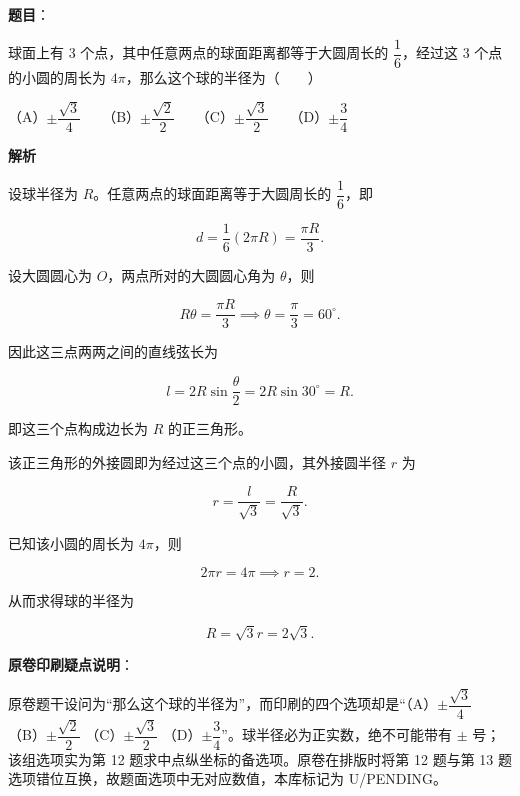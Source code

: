 \begin{answer}

\textbf{题目}：

球面上有 3 个点，其中任意两点的球面距离都等于大圆周长的 $\dfrac16$，经过这 3 个点的小圆的周长为 $4\pi$，那么这个球的半径为\mbox{（　　）}

（A）$\pm\dfrac{\sqrt3}4$　　（B）$\pm\dfrac{\sqrt2}2$　　（C）$\pm\dfrac{\sqrt3}2$　　（D）$\pm\dfrac34$

\textbf{解析}

设球半径为 $R$。任意两点的球面距离等于大圆周长的 $\dfrac16$，即

\nopagebreak[4]
\[
d = \frac16 (2\pi R) = \frac{\pi R}{3}.
\]

设大圆圆心为 $O$，两点所对的大圆圆心角为 $\theta$，则

\nopagebreak[4]
\[
R\theta = \frac{\pi R}{3} \implies \theta = \frac\pi3 = 60^\circ.
\]

因此这三点两两之间的直线弦长为

\nopagebreak[4]
\[
l = 2R\sin\frac\theta2 = 2R\sin30^\circ = R.
\]

即这三个点构成边长为 $R$ 的正三角形。

该正三角形的外接圆即为经过这三个点的小圆，其外接圆半径 $r$ 为

\nopagebreak[4]
\[
r = \frac{l}{\sqrt3} = \frac{R}{\sqrt3}.
\]

已知该小圆的周长为 $4\pi$，则

\nopagebreak[4]
\[
2\pi r = 4\pi \implies r = 2.
\]

从而求得球的半径为

\nopagebreak[4]
\[
R = \sqrt3 r = 2\sqrt3.
\]

\textbf{原卷印刷疑点说明}：

原卷题干设问为“那么这个球的半径为”，而印刷的四个选项却是“（A）$\pm\dfrac{\sqrt3}4$ （B）$\pm\dfrac{\sqrt2}2$ （C）$\pm\dfrac{\sqrt3}2$ （D）$\pm\dfrac34$”。球半径必为正实数，绝不可能带有 $\pm$ 号；该组选项实为第 12 题求中点纵坐标的备选项。原卷在排版时将第 12 题与第 13 题选项错位互换，故题面选项中无对应数值，本库标记为 U/PENDING。


\end{answer}
